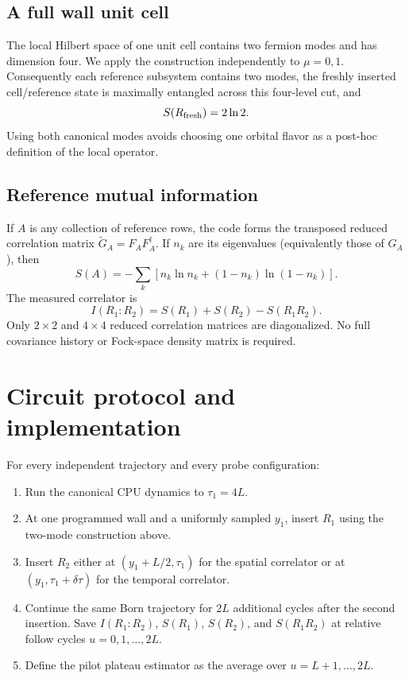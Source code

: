 \documentclass[10pt]{article}
\begin{document}
\subsection{A full wall unit cell}

The local Hilbert space of one unit cell contains two fermion modes and has
dimension four.  We apply the construction independently to $\mu=0,1$.
Consequently each reference subsystem contains two modes, the freshly inserted
cell/reference state is maximally entangled across this four-level cut, and
\begin{equation}
S(R_{\rm fresh})=2\ln2.
\end{equation}
Using both canonical modes avoids choosing one orbital flavor as a
post-hoc definition of the local operator.

\subsection{Reference mutual information}

If $A$ is any collection of reference rows, the code forms the transposed
reduced correlation matrix $\widetilde G_A=F_AF_A^\dagger$.  If $n_k$ are its
eigenvalues (equivalently those of $G_A$), then
\begin{equation}
S(A)=-\sum_k\left[n_k\ln n_k+(1-n_k)\ln(1-n_k)\right].
\end{equation}
The measured correlator is
\begin{equation}
I(R_1:R_2)=S(R_1)+S(R_2)-S(R_1R_2).
\label{eq:mi}
\end{equation}
Only $2\times2$ and $4\times4$ reduced correlation matrices are diagonalized.
No full covariance history or Fock-space density matrix is required.

\section{Circuit protocol and implementation}

For every independent trajectory and every probe configuration:
\begin{enumerate}
\item Run the canonical CPU dynamics to $\tau_1=4L$.
\item At one programmed wall and a uniformly sampled $y_1$, insert $R_1$ using
      the two-mode construction above.
\item Insert $R_2$ either at $(y_1+L/2,\tau_1)$ for the spatial correlator or at
      $(y_1,\tau_1+\delta\tau)$ for the temporal correlator.
\item Continue the same Born trajectory for $2L$ additional cycles after the
      second insertion.  Save $I(R_1:R_2)$, $S(R_1)$, $S(R_2)$, and $S(R_1R_2)$
      at relative follow cycles $u=0,1,\ldots,2L$.
\item Define the pilot plateau estimator as the average over $u=L+1,\ldots,2L$.
\end{enumerate}
\end{document}
